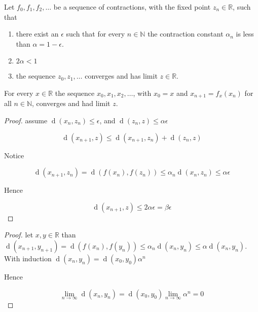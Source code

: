 \begin{theorem}
  Let $f_{0}, f_{1}, f_{2}, \ldots$ be a sequence of contractions, with the
  fixed point $z_{n}\in\mathbb{R}$, such that
  \begin{enumerate}
    \item there exist an $\epsilon$ such that for every $n\in\mathbb{N}$ the
      contraction constant $\alpha_{n}$ is less than $\alpha = 1 - \epsilon$.

    \item $2\alpha < 1$

    \item the sequence $z_{0}, z_{1}, \ldots$ converges and has limit
      $z\in\mathbb{R}$.  
  \end{enumerate}
  

  For every $x\in\mathbb{R}$ the sequence $x_{0}, x_{1}, x_{2}, \ldots$, with
  $x_{0} = x$ and $x_{n+1} = f_{x}(x_{n})$ for all $n\in\mathbb{N}$, converges and
  had limit $z$.
\end{theorem}

\begin{proof}
  assume $\mathop{d}(x_{n}, z_{n}) \le \epsilon$, and $\mathop{d}(z_{n}, z) \le \alpha\epsilon$ 

  \[
  \mathop{d}(x_{n+1}, z) \le \mathop{d}(x_{n+1}, z_{n}) + \mathop{d}(z_{n}, z)
  \]

  Notice

  \[
  \mathop{d}(x_{n+1}, z_{n}) = \mathop{d}(f(x_{n}), f(z_{n})) \le \alpha_{n} \mathop{d}(x_{n}, z_{n}) \le \alpha \epsilon
  \]

  Hence

  \[
  \mathop{d}(x_{n+1}, z) \le 2 \alpha \epsilon = \beta \epsilon
  \]
\end{proof}

\begin{proof}
  let $x,y \in \mathbb{R}$ than $\mathop{d}(x_{n+1}, y_{n+1}) =
  \mathop{d}(f(x_{n}), f(y_{n})) \le \alpha_{n}\mathop{d}(x_{n}, y_{n}) \le
  \alpha\mathop{d}(x_{n}, y_{n})$. With induction $\mathop{d}(x_{n}, y_{n}) =
  \mathop{d}(x_{0}, y_{0}) \alpha^{n}$ 

  Hence

  \[
  \lim_{n \rightarrow \infty} \mathop{d}(x_{n}, y_{n}) = \mathop{d}(x_{0}, y_{0})\lim_{n \rightarrow \infty} \alpha^{n} = 0
  \]

\end{proof}

